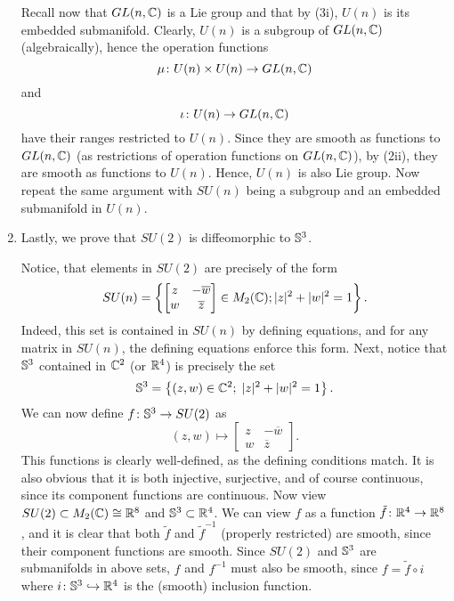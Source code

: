 \documentclass[a4paper, 12pt]{article}
\begin{document}
\begin{Exercise}
\begin{enumerate}[label=(\roman*)]
            Recall now that $GL(n, \C)$ is a Lie group and that by (3i), $U(n)$ is its embedded submanifold.
            Clearly, $U(n)$ is a subgroup of $GL(n, \C)$ (algebraically), hence the operation functions
            \[
                \mu \colon U(n)\times U(n) \to GL(n, \C)
            \]
            and
            \[
                \iota \colon U(n) \to GL(n, \C)
            \]
            have their ranges restricted to $U(n)$.
            Since they are smooth as functions to $GL(n, \C)$ (as restrictions of operation functions on $GL(n, \C)$),
            by (2ii), they are smooth as functions to $U(n)$.
            Hence, $U(n)$ is also Lie group.
            Now repeat the same argument with $SU(n)$ being a subgroup and an embedded submanifold in $U(n)$.
        \item
            Lastly, we prove that $SU(2)$ is diffeomorphic to $\S^3$.

            Notice, that elements in $SU(2)$ are precisely of the form
            \[
                SU(n) = \left\{
                \begin{bmatrix}
                    z & -\overline{w} \\
                    w & \overline{z}
                \end{bmatrix}
                \in M_2(\C) ; |z|^2 + |w|^2 = 1\right\}.
            \]
            Indeed, this set is contained in $SU(n)$ by defining equations,
            and for any matrix in $SU(n)$, the defining equations enforce this form.
            Next, notice that $\S^3$ contained in $\C^2$ (or $\R^4$) is precisely the set
            \[
                \S^3 = \left\{ (z, w) \in \C^2 ; \; |z|^2 + |w|^2 = 1 \right\}.
            \]
            We can now define $f \colon \S^3 \to SU(2)$ as
            \[
                (z, w) \mapsto
                \begin{bmatrix}
                    z & -\overline{w} \\
                    w & \overline{z}
                \end{bmatrix}.
            \]
            This functions is clearly well-defined, as the defining conditions match.
            It is also obvious that it is both injective, surjective, and of course continuous, since its component functions are continuous.
            Now view $SU(2) \subset M_2(\C) \iso \R^8$ and $\S^3 \subset \R^4$.
            We can view $f$ as a function $\tilde{f} \colon \R^4 \to \R^8$,
            and it is clear that both $\tilde{f}$ and $\tilde{f}^{-1}$ (properly restricted) are smooth,
            since their component functions are smooth.
            Since $SU(2)$ and $\S^3$ are submanifolds in above sets,
            $f$ and $f^{-1}$ must also be smooth,
            since $f = \tilde{f}\circ i$ where $i \colon \S^3 \hookrightarrow \R^4$ is the (smooth) inclusion function.
    \end{enumerate}
\end{Exercise}
\end{document}
